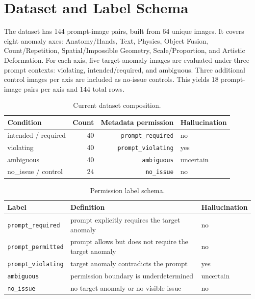 \documentclass[11pt]{article}
\begin{document}
\section{Dataset and Label Schema}

The dataset has 144 prompt-image pairs, built from 64 unique images. It covers eight anomaly axes: Anatomy/Hands, Text, Physics, Object Fusion, Count/Repetition, Spatial/Impossible Geometry, Scale/Proportion, and Artistic Deformation. For each axis, five target-anomaly images are evaluated under three prompt contexts: violating, intended/required, and ambiguous. Three additional control images per axis are included as no-issue controls. This yields 18 prompt-image pairs per axis and 144 total rows.

\begin{table}[t]
\centering
\caption{Current dataset composition.}
\begin{tabular}{lrrl}
\toprule
Condition & Count & Metadata permission & Hallucination \\
\midrule
intended / required & 40 & \texttt{prompt\_required} & no \\
violating & 40 & \texttt{prompt\_violating} & yes \\
ambiguous & 40 & \texttt{ambiguous} & uncertain \\
no\_issue / control & 24 & \texttt{no\_issue} & no \\
\bottomrule
\end{tabular}
\end{table}

\begin{table}[t]
\centering
\caption{Permission label schema.}
\begin{tabularx}{\linewidth}{lXl}
\toprule
Label & Definition & Hallucination \\
\midrule
\texttt{prompt\_required} & prompt explicitly requires the target anomaly & no \\
\texttt{prompt\_permitted} & prompt allows but does not require the target anomaly & no \\
\texttt{prompt\_violating} & target anomaly contradicts the prompt & yes \\
\texttt{ambiguous} & permission boundary is underdetermined & uncertain \\
\texttt{no\_issue} & no target anomaly or no visible issue & no \\
\bottomrule
\end{tabularx}
\end{table}
\end{document}

